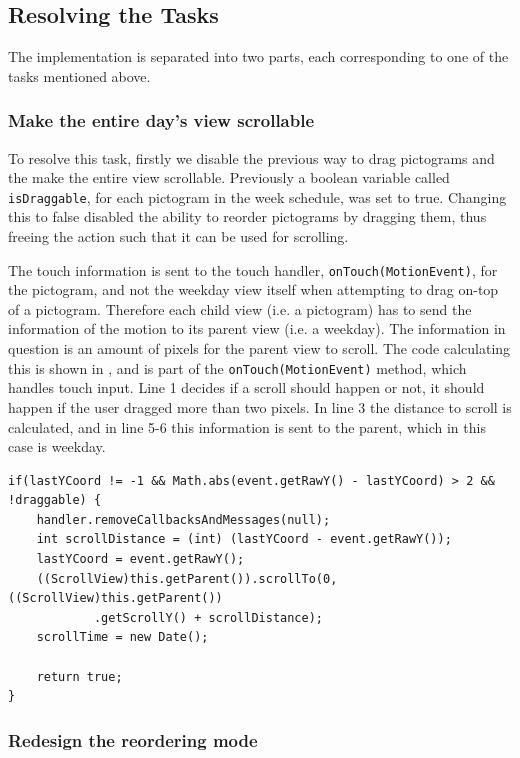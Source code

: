 \subsection*{Resolving the Tasks}
The implementation is separated into two parts, each corresponding to one of the tasks mentioned above.
\subsubsection*{Make the entire day's view scrollable}
To resolve this task, firstly we disable the previous way to drag pictograms and the make the entire view scrollable.
Previously a boolean variable called \texttt{isDraggable}, for each pictogram in the week schedule, was set to true.
Changing this to false disabled the ability to reorder pictograms by dragging them, thus freeing the action such that it can be used for scrolling.

The touch information is sent to the touch handler, \texttt{onTouch(MotionEvent)}, for the pictogram, and not the weekday view itself when attempting to drag on-top of a pictogram.
Therefore each child view (i.e. a pictogram) has to send the information of the motion to its parent view (i.e. a weekday).
The information in question is an amount of pixels for the parent view to scroll.
The code calculating this is shown in , and is part of the \texttt{onTouch(MotionEvent)} method, which handles touch input.
Line 1 decides if a scroll should happen or not, it should happen if the user dragged more than two pixels.
In line 3 the distance to scroll is calculated, and in line 5-6 this information is sent to the parent, which in this case is weekday.

\begin{lstlisting}[floatplacement=h, caption={The code executed when someone performs a move action.}, label={lst:actionmove}]
if(lastYCoord != -1 && Math.abs(event.getRawY() - lastYCoord) > 2 && !draggable) {
    handler.removeCallbacksAndMessages(null);
    int scrollDistance = (int) (lastYCoord - event.getRawY());
    lastYCoord = event.getRawY();
    ((ScrollView)this.getParent()).scrollTo(0,((ScrollView)this.getParent())
            .getScrollY() + scrollDistance);
    scrollTime = new Date();

    return true;
}
\end{lstlisting}

\subsubsection*{Redesign the reordering mode}

